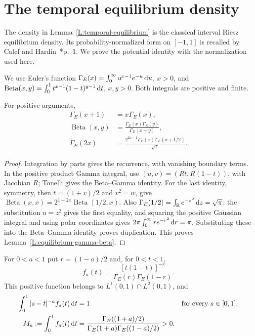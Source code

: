 \section{The temporal equilibrium density}
\label{S:temporal-equilibrium}

The density in Lemma~\ref{L:temporal-equilibrium} is the classical interval
Riesz equilibrium density. Its probability-normalized form on $[-1,1]$ is
recalled by Calef and Hardin~\cite{calef.hardin:source2008:riesz}*{p.~1}.
We prove the potential identity with the normalization used here.

We use Euler's function $\Gamma_E(x) = \int_0^\infty u^{x-1}e^{-u}\,\mathrm{d} u$, $x >
0$, and $\operatorname{Beta}(x,y) = \int_0^1t^{x-1}(1-t)^{y-1}\,\mathrm{d} t$, $x,y > 0$.
Both integrals are positive and finite.

\begin{lemma}\label{L:equilibrium-gamma-beta}
  For positive arguments,
  \begin{align*}
    \Gamma_E(x+1)&=x\Gamma_E(x),\\
    \operatorname{Beta}(x,y)
    &=\frac{\Gamma_E(x)\Gamma_E(y)}{\Gamma_E(x+y)},\\
    \Gamma_E(2x)
    &=\frac{2^{2x-1}\Gamma_E(x)\Gamma_E(x+1/2)}{\sqrt\pi}.
  \end{align*}
\end{lemma}

\begin{proof}
  Integration by parts gives the recurrence, with vanishing boundary terms. In
  the positive product Gamma integral, use $(u,v) = (Rt,R(1-t))$, with Jacobian
  $R$; Tonelli gives the Beta--Gamma identity. For the last identity, symmetry,
  then $t = (1+v)/2$ and $v^2 = w$, give $\operatorname{Beta}(x,x) =
  2^{1-2x}\operatorname{Beta}(1/2,x)$. Also $\Gamma_E(1/2) = \int_{\mathbb{R}} e^{-z^2}\,\mathrm{d}
  z = \sqrt\pi$: the substitution $u = z^2$ gives the first equality, and
  squaring the positive Gaussian integral and using polar coordinates gives
  $2\pi\int_0^\infty re^{-r^2}\,\mathrm{d} r = \pi$. Substituting these into the
  Beta--Gamma identity proves duplication. This proves
  Lemma~\ref{L:equilibrium-gamma-beta}.
\end{proof}

\begin{lemma}\label{L:temporal-equilibrium}
  For $0 < a < 1$ put $r = (1-a)/2$ and, for $0 < t < 1$,
  \begin{equation}\label{E:temporal-equilibrium-density}
    f_a(t)=\frac{[t(1-t)]^{-r}}{\Gamma_E(r)\Gamma_E(1-r)}.
  \end{equation}
  This positive function belongs to $L^1(0,1)\cap L^2(0,1)$, and
  \begin{align}
    \int_0^1|s-t|^{-a}f_a(t)\,\mathrm{d} t&=1
    &&\text{for every }s\in[0,1],\label{E:temporal-equilibrium-potential}\\
    M_a:=\int_0^1f_a(t)\,\mathrm{d} t
    &=\frac{\Gamma_E((1+a)/2)}
    {\Gamma_E(1+a)\Gamma_E((1-a)/2)}>0.
    \label{E:temporal-equilibrium-mass}
  \end{align}
\end{lemma}

